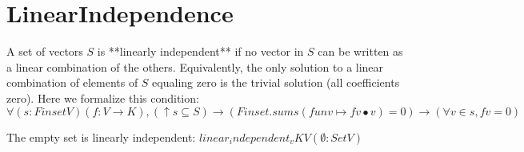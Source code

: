 \section{LinearIndependence}

\begin{definition}
  \label{definition : linear_independent}
  \leanok
  A set of vectors $S$ is **linearly independent** if no vector in $S$ can be written as a linear combination of the others. Equivalently, the only solution to a linear combination of elements of $S$ equaling zero is the trivial solution (all coefficients zero). Here we formalize this condition: $\forall (s : Finset V) (f : V \rightarrow K),
(↑s \subseteq S) \rightarrow (Finset.sum s (fun v \mapsto f v \bullet v) = 0) \rightarrow (\forall v \in s, f v = 0)$
\end{definition}

\begin{theorem}
  \label{theorem : linear_independent_empty}
  \leanok
  The empty set is linearly independent: $linear_independent_v K V (\emptyset : Set V)$
\end{theorem}
